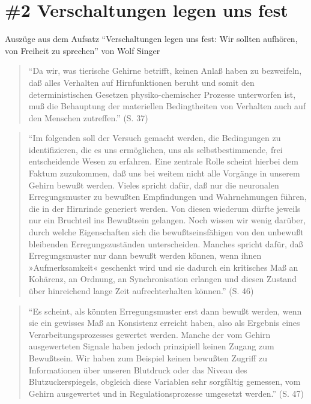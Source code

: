 \documentclass[
  a4paper,
]{report}
\begin{document}
\hypertarget{def-ev2}{%
\section{\#2 Verschaltungen legen uns fest}\label{def-ev2}}

Auszüge aus dem Aufsatz ``Verschaltungen legen uns fest: Wir sollten aufhören, von Freiheit zu sprechen'' von Wolf Singer \citeyearpar{Singer2004}

\begin{quote}
``Da wir, was tierische Gehirne betrifft, keinen Anlaß haben zu bezweifeln, daß alles Verhalten auf Hirnfunktionen beruht und somit den deterministischen Gesetzen physiko-chemischer Prozesse unterworfen ist, muß die Behauptung der materiellen Bedingtheiten von Verhalten auch auf den Menschen zutreffen.'' (S. 37)
\end{quote}

\begin{quote}
``Im folgenden soll der Versuch gemacht werden, die Bedingungen zu identifizieren, die es uns ermöglichen, uns als selbstbestimmende, frei entscheidende Wesen zu erfahren. Eine zentrale Rolle scheint hierbei dem Faktum zuzukommen, daß uns bei weitem nicht alle Vorgänge in unserem Gehirn bewußt werden. Vieles spricht dafür, daß nur die neuronalen Erregungsmuster zu bewußten Empfindungen und Wahrnehmungen führen, die in der Hirnrinde generiert werden. Von diesen wiederum dürfte jeweils nur ein Bruchteil ins Bewußtsein gelangen. Noch wissen wir wenig darüber, durch welche Eigenschaften sich die bewußtseinsfähigen von den unbewußt bleibenden Erregungszuständen unterscheiden. Manches spricht dafür, daß Erregungsmuster nur dann bewußt werden können, wenn ihnen »Aufmerksamkeit« geschenkt wird und sie dadurch ein kritisches Maß an Kohärenz, an Ordnung, an Synchronisation erlangen und diesen Zustand über hinreichend lange Zeit aufrechterhalten können.'' (S. 46)
\end{quote}

\begin{quote}
``Es scheint, als könnten Erregungsmuster erst dann bewußt werden, wenn sie ein gewisses Maß an Konsistenz erreicht haben, also als Ergebnis eines Verarbeitungsprozesses gewertet werden. Manche der vom Gehirn ausgewerteten Signale haben jedoch prinzipiell keinen Zugang zum Bewußtsein. Wir haben zum Beispiel keinen bewußten Zugriff zu Informationen über unseren Blutdruck oder das Niveau des Blutzuckerspiegels, obgleich diese Variablen sehr sorgfältig gemessen, vom Gehirn ausgewertet und in Regulationsprozesse umgesetzt werden.'' (S. 47)
\end{quote}
\end{document}
